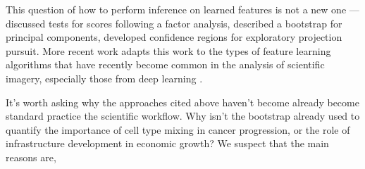 This question of how to perform inference on learned features is not a new one —
\cite{rao1955estimation} discussed tests for scores following a factor analysis,
\cite{diaconis1983computer} described a bootstrap for principal components,
\cite{elguero1988confidence} developed confidence regions for exploratory
projection pursuit. More recent work adapts this work to the types of feature
learning algorithms that have recently become common in the analysis of
scientific imagery, especially those from deep learning \citep{wang2020methods}.

It’s worth asking why the approaches cited above haven’t become already become
standard practice the scientific workflow. Why isn’t the bootstrap already used
to quantify the importance of cell type mixing in cancer progression, or the
role of infrastructure development in economic growth? We suspect that the main
reasons are,

